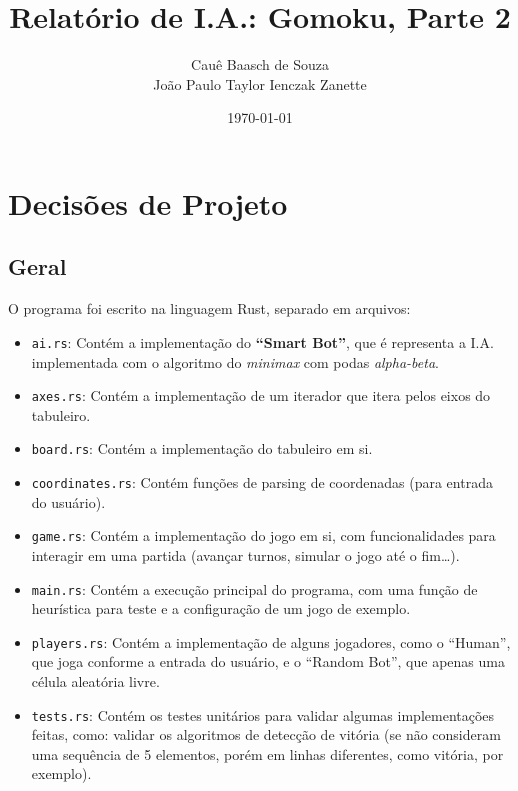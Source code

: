 \documentclass{article}
\title{Relatório de I.A.: Gomoku, Parte 2}
\author{Cauê Baasch de Souza \\
        João Paulo Taylor Ienczak Zanette}
\date{\today}
\newcommand{\todo}[1]{{\color{red}{#1}}}
\begin{document}
    \maketitle{}

    \section{Decisões de Projeto}

    \subsection{Geral}

    O programa foi escrito na linguagem Rust, separado em \todo{X} arquivos:

    \begin{itemize}
        \item \texttt{ai.rs}: Contém a implementação do \textbf{``Smart Bot''},
            que é representa a I.A. implementada com o algoritmo do
            \textit{minimax} com podas \textit{alpha-beta}.
        \item \texttt{axes.rs}: Contém a implementação de um iterador que itera
            pelos eixos do tabuleiro.
        \item \texttt{board.rs}: Contém a implementação do tabuleiro em si.
        \item \texttt{coordinates.rs}: Contém funções de parsing de coordenadas
            (para entrada do usuário).
        \item \texttt{game.rs}: Contém a implementação do jogo em si, com
            funcionalidades para interagir em uma partida (avançar turnos,
            simular o jogo até o fim\ldots).
        \item \texttt{main.rs}: Contém a execução principal do programa, com
            uma função de heurística para teste e a configuração de um jogo de
            exemplo.
        \item \texttt{players.rs}: Contém a implementação de alguns jogadores,
            como o ``Human'', que joga conforme a entrada do usuário, e o
            ``Random Bot'', que apenas uma célula aleatória livre.
        \item \texttt{tests.rs}: Contém os testes unitários para validar
            algumas implementações feitas, como: validar os algoritmos de
            detecção de vitória (se não consideram uma sequência de 5
            elementos, porém em linhas diferentes, como vitória, por exemplo).
    \end{itemize}
\end{document}
